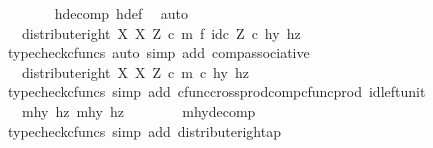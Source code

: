 \begin{isabellebody}
\ \ \ \ \ \ \isamarkupfalse%
\ h{\isacharunderscore}{\kern0pt}decomp\ h{\isacharunderscore}{\kern0pt}def\ \isamarkupfalse%
\ auto\isanewline
\ \ \ \ \isamarkupfalse%
\ \isamarkupfalse%
\ {\isachardoublequoteopen}{\isachardot}{\kern0pt}{\isachardot}{\kern0pt}{\isachardot}{\kern0pt}\ {\isacharequal}{\kern0pt}\ distribute{\isacharunderscore}{\kern0pt}right\ X\ X\ Z\ {\isasymcirc}\isactrlsub c\ {\isacharparenleft}{\kern0pt}m\ {\isasymtimes}\isactrlsub f\ id\isactrlsub c\ Z{\isacharparenright}{\kern0pt}\ {\isasymcirc}\isactrlsub c\ {\isasymlangle}hy{\isacharcomma}{\kern0pt}\ hz{\isasymrangle}{\isachardoublequoteclose}\isanewline
\ \ \ \ \ \ \isamarkupfalse%
\ {\isacharparenleft}{\kern0pt}typecheck{\isacharunderscore}{\kern0pt}cfuncs{\isacharcomma}{\kern0pt}\ auto\ simp\ add{\isacharcolon}{\kern0pt}\ comp{\isacharunderscore}{\kern0pt}associative{}{\isacharparenright}{\kern0pt}\isanewline
\ \ \ \ \isamarkupfalse%
\ \isamarkupfalse%
\ {\isachardoublequoteopen}{\isachardot}{\kern0pt}{\isachardot}{\kern0pt}{\isachardot}{\kern0pt}\ {\isacharequal}{\kern0pt}\ distribute{\isacharunderscore}{\kern0pt}right\ X\ X\ Z\ {\isasymcirc}\isactrlsub c\ {\isasymlangle}m\ {\isasymcirc}\isactrlsub c\ hy{\isacharcomma}{\kern0pt}\ hz{\isasymrangle}{\isachardoublequoteclose}\isanewline
\ \ \ \ \ \ \isamarkupfalse%
\ {\isacharparenleft}{\kern0pt}typecheck{\isacharunderscore}{\kern0pt}cfuncs{\isacharcomma}{\kern0pt}\ simp\ add{\isacharcolon}{\kern0pt}\ cfunc{\isacharunderscore}{\kern0pt}cross{\isacharunderscore}{\kern0pt}prod{\isacharunderscore}{\kern0pt}comp{\isacharunderscore}{\kern0pt}cfunc{\isacharunderscore}{\kern0pt}prod\ id{\isacharunderscore}{\kern0pt}left{\isacharunderscore}{\kern0pt}unit{}{\isacharparenright}{\kern0pt}\isanewline
\ \ \ \ \isamarkupfalse%
\ \isamarkupfalse%
\ {\isachardoublequoteopen}{\isachardot}{\kern0pt}{\isachardot}{\kern0pt}{\isachardot}{\kern0pt}\ {\isacharequal}{\kern0pt}\ {\isasymlangle}{\isasymlangle}mhy{}{\isacharcomma}{\kern0pt}\ hz{\isasymrangle}{\isacharcomma}{\kern0pt}\ {\isasymlangle}mhy{}{\isacharcomma}{\kern0pt}\ hz{\isasymrangle}{\isasymrangle}{\isachardoublequoteclose}\isanewline
\ \ \ \ \ \ \isamarkupfalse%
\ mhy{\isacharunderscore}{\kern0pt}decomp\ \isamarkupfalse%
\ {\isacharparenleft}{\kern0pt}typecheck{\isacharunderscore}{\kern0pt}cfuncs{\isacharcomma}{\kern0pt}\ simp\ add{\isacharcolon}{\kern0pt}\ distribute{\isacharunderscore}{\kern0pt}right{\isacharunderscore}{\kern0pt}ap{\isacharparenright}{\kern0pt}\isanewline

\end{isabellebody}
